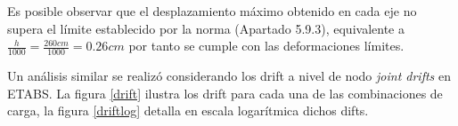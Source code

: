 
Es posible observar que el desplazamiento máximo obtenido en cada eje no supera el límite establecido por la norma (Apartado 5.9.3), equivalente a $\frac{h}{1000} = \frac{260cm}{1000} = 0.26cm$ por tanto se cumple con las deformaciones límites.\newpage

Un análisis similar se realizó considerando los drift a nivel de nodo \textit{joint drifts} en ETABS. La figura \ref{drift} ilustra los drift para cada una de las combinaciones de carga, la figura \ref{driftlog} detalla en escala logarítmica dichos difts.



